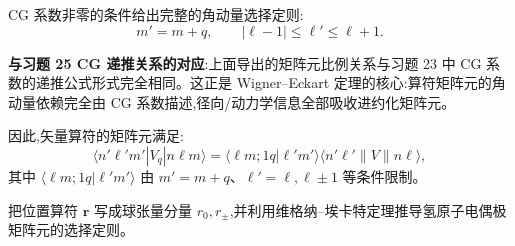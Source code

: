 \begin{solution}
	CG 系数非零的条件给出完整的角动量选择定则:
	\[
	m' = m+q,\qquad |\ell-1| \le \ell' \le \ell+1.
	\]

	\textbf{与习题 25 CG 递推关系的对应}:上面导出的矩阵元比例关系与习题 23 中 CG 系数的递推公式形式完全相同。这正是 Wigner--Eckart 定理的核心:算符矩阵元的角动量依赖完全由 CG 系数描述,径向/动力学信息全部吸收进约化矩阵元。

	因此,矢量算符的矩阵元满足:
	\[
	\boxed{\langle n'\ell'm'|V_q|n\ell m\rangle
	= \langle \ell m;1q|\ell'm'\rangle\langle n'\ell'\|V\|n\ell\rangle},
	\]
	其中 $\langle \ell m;1q|\ell'm'\rangle$ 由 $m'=m+q$、$\ell'=\ell,\ell\pm1$ 等条件限制。
	\end{solution}

\begin{question}
把位置算符 $\mathbf r$ 写成球张量分量 $r_0,r_\pm$,并利用维格纳--埃卡特定理推导氢原子电偶极矩阵元的选择定则。
\end{question}

